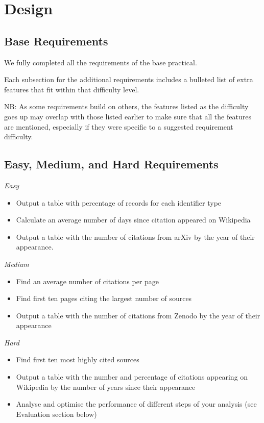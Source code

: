 \documentclass[12pt,a4paper,final]{article}
\begin{document}
\section*{Design}

\subsection*{Base Requirements}

We fully completed all the requirements of the base practical.

Each subsection for the additional requirements includes a bulleted list of
extra features that fit within that difficulty level.

NB: As some requirements build on others, the features listed as the difficulty goes
up may overlap with those listed earlier to make sure that all the features are mentioned,
especially if they were specific to a suggested requirement difficulty.

\subsection*{Easy, Medium, and Hard Requirements}
\begin{center} \emph{Easy} \end{center}
\begin{itemize}[noitemsep]
    \item Output a table with percentage of records for each identifier type
    \item Calculate an average number of days since citation appeared on Wikipedia
    \item Output a table with the number of citations from arXiv by the year of their appearance.
\end{itemize}

\begin{center} \emph{Medium} \end{center}
\begin{itemize}[noitemsep]
    \item Find an average number of citations per page
    \item Find first ten pages citing the largest number of sources
    \item Output a table with the number of citations from Zenodo by the year of their appearance
\end{itemize}

\begin{center} \emph{Hard} \end{center}
\begin{itemize}[noitemsep]
    \item Find first ten most highly cited sources
    \item Output a table with the number and percentage of citations appearing on Wikipedia by the number of years since their appearance
    \item Analyse and optimise the performance of different steps of your analysis (see Evaluation section below)
\end{itemize}
\end{document}
